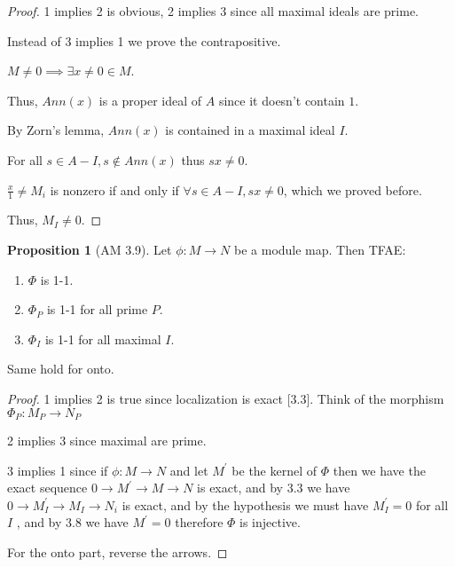 \documentclass{article}
\theoremstyle{definition}
\newtheorem{proposition}{Proposition}
\begin{document}
\begin{proof}
    1 implies 2 is obvious, 2 implies 3 since all maximal ideals are prime.

    Instead of 3 implies 1 we prove the contrapositive.

    \(M \neq 0 \implies \exists x\neq 0\in M\).

    Thus, \(Ann(x)\) is a proper ideal of \(A\) since it doesn't contain \(1\).

    By Zorn's lemma, \(Ann(x)\) is contained in a maximal ideal \(I\).

    For all \(s\in A - I, s\notin Ann(x)\) thus \(sx\neq 0\).

    \(\frac{x}{1}\neq M_i\) is nonzero if and only if \(\forall s\in A - I, sx\neq 0\), which we proved before.

    Thus, \(M_I\neq 0\).

\end{proof}

\begin{proposition}
    [AM 3.9]

    Let \(\phi:M\to N\) be a module map. Then TFAE:

    \begin{enumerate}
        \item \(\Phi\) is 1-1.
        \item \(\Phi_P\) is 1-1 for all prime \(P\).
        \item \(\Phi_I\) is 1-1 for all maximal \(I\). 
    \end{enumerate}

    Same hold for onto.

\end{proposition}

\begin{proof}
    1 implies 2 is true since localization is exact [3.3]. Think of the morphism \(\Phi_P:M_P\to N_P\)
    
    2 implies 3 since maximal are prime.

    3 implies 1 since if \(\phi:M\to N\) and let \(M^{\prime} \) be the kernel of \(\Phi\) then we have the exact sequence \(0 \to M^{\prime} \to M\to N\) is exact, and by 3.3 we have \(0 \to M_I^{\prime} \to M_I \to N_i\) is exact, and by the hypothesis we must have \(M_I^{\prime} = 0\) for all \(I\) , and by 3.8 we have \(M^{\prime} =0\) therefore \(\Phi\) is injective.

    For the onto part, reverse the arrows.
\end{proof}
\end{document}
